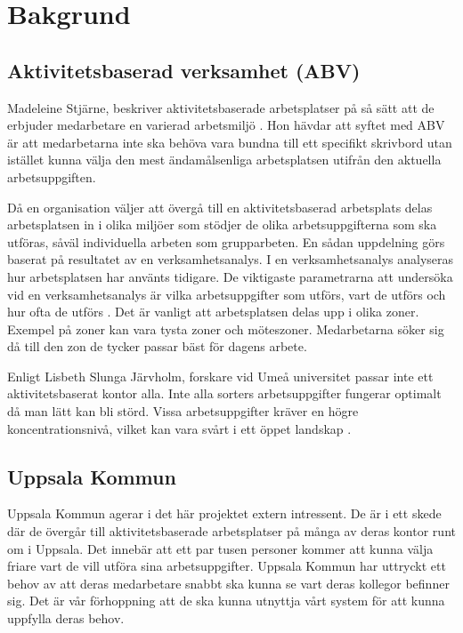 \documentclass[swedish, a4paper,12pt]{article}
\begin{document}
\section{Bakgrund}
\subsection{Aktivitetsbaserad verksamhet (ABV)}
Madeleine Stjärne, beskriver aktivitetsbaserade arbetsplatser på så sätt att de erbjuder medarbetare en varierad arbetsmiljö \cite{ABV}. Hon hävdar att syftet med ABV är att medarbetarna inte ska behöva vara bundna till ett specifikt skrivbord utan istället kunna välja den mest ändamålsenliga arbetsplatsen utifrån den aktuella arbetsuppgiften. %

Då en organisation väljer att övergå till en aktivitetsbaserad arbetsplats
delas arbetsplatsen in i olika miljöer som stödjer de olika arbetsuppgifterna som ska utföras, såväl individuella arbeten som grupparbeten. En sådan uppdelning görs baserat på resultatet av en verksamhetsanalys. I en verksamhetsanalys analyseras hur arbetsplatsen har använts tidigare. De viktigaste parametrarna att undersöka vid en verksamhetsanalys är vilka arbetsuppgifter som utförs, vart de utförs och hur ofta de utförs \cite{ABV}.
Det är vanligt att arbetsplatsen delas upp i olika zoner. Exempel på zoner kan vara tysta zoner och möteszoner. Medarbetarna söker sig då till den zon de tycker passar bäst för dagens arbete.

Enligt Lisbeth Slunga Järvholm, forskare vid Umeå universitet passar inte ett aktivitetsbaserat kontor alla. Inte alla sorters arbetsuppgifter fungerar optimalt då man lätt kan bli störd. Vissa arbetsuppgifter kräver en högre koncentrationsnivå, vilket kan vara svårt i ett öppet landskap \cite{passarInteAlla}.

\subsection{Uppsala Kommun}
Uppsala Kommun agerar i det här projektet extern intressent. De är i ett skede där de övergår till aktivitetsbaserade arbetsplatser på många av deras kontor runt om i Uppsala. Det innebär att %
ett par tusen personer kommer att kunna välja friare vart de vill utföra sina arbetsuppgifter. Uppsala Kommun har uttryckt ett behov av att deras medarbetare snabbt ska kunna se vart deras kollegor befinner sig. Det är vår förhoppning att de ska kunna utnyttja vårt system för att kunna uppfylla deras behov.
\end{document}
